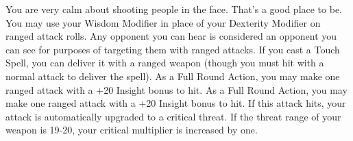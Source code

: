 {You are very calm about shooting people in the face. That's a good place to be.}
{You may use your Wisdom Modifier in place of your Dexterity Modifier on ranged attack rolls.}
{Any opponent you can hear is considered an opponent you can see for purposes of targeting them with ranged attacks.}
{If you cast a Touch Spell, you can deliver it with a ranged weapon (though you must hit with a normal attack to deliver the spell).}
{As a Full Round Action, you may make one ranged attack with a +20 Insight bonus to hit.}
{As a Full Round Action, you may make one ranged attack with a +20 Insight bonus to hit. If this attack hits, your attack is automatically upgraded to a critical threat. If the threat range of your weapon is 19-20, your critical multiplier is increased by one.}